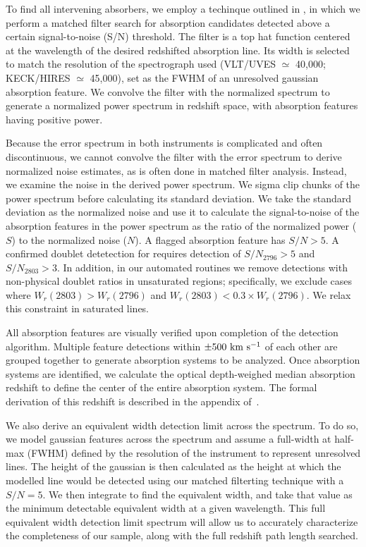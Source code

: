 \documentclass[iop,apj,numberedappendix,appendixfloats,twocolappendix]{emulateapj}
\begin{document}
To find all intervening {\MgIIdblt} absorbers, we employ a techinque outlined in \cite{Zhu2013}, in which we perform a matched filter search for absorption candidates detected above a certain signal-to-noise (S/N) threshold. The filter is a top hat function centered at the wavelength of the desired redshifted absorption line. Its width is selected to match the resolution of the spectrograph used (VLT/UVES $\simeq$ 40,000; KECK/HIRES $\simeq$ 45,000), set as the FWHM of an unresolved gaussian absorption feature. We convolve the filter with the normalized spectrum to generate a normalized power spectrum in redshift space, with absorption features having positive power. 

Because the error spectrum in both instruments is complicated and often discontinuous, we cannot convolve the filter with the error spectrum to derive normalized noise estimates, as is often done in matched filter analysis. Instead, we examine the noise in the derived power spectrum. We sigma clip chunks of the power spectrum before calculating its standard deviation. We take the standard deviation as the normalized noise and use it to calculate the signal-to-noise of the absorption features in the power spectrum as the ratio of the normalized power ($S$) to the normalized noise ($N$). A flagged absorption feature has $S/N > 5$. A confirmed doublet detetection for {\MgIIdblt} requires detection of $S/N_{2796} > 5$ and $S/N_{2803} > 3$. In addition, in our automated routines we remove detections with non-physical doublet ratios in unsaturated regions; specifically, we exclude cases where $W_r(2803) > W_r(2796)$ and $W_r(2803) < 0.3 \times W_r(2796)$. We relax this constraint in saturated lines. 

All absorption features are visually verified upon completion of the detection algorithm. Multiple feature detections within $\pm 500~\hbox{km~s$^{-1}$}$ of each other are grouped together to generate absorption systems to be analyzed. Once absorption systems are identified, we calculate the optical depth-weighed median absorption redshift to define the center of the entire absorption system. The formal derivation of this redshift is described in the appendix of~\cite{Churchill2001}.

We also derive an equivalent width detection limit across the spectrum. To do so, we model gaussian features across the spectrum and assume a full-width at half-max (FWHM) defined by the resolution of the instrument to represent unresolved lines. The height of the gaussian is then calculated as the height at which the modelled line would be detected using our matched filterting technique with a $S/N = 5$. We then integrate to find the equivalent width, and take that value as the minimum detectable equivalent width at a given wavelength. This full equivalent width detection limit spectrum will allow us to accurately characterize the completeness of our sample, along with the full redshift path length searched. 
\end{document}
